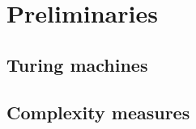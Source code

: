 
\chapter{Preliminaries} \label{chap:preliminaries}

\section{Turing machines}

\section{Complexity measures}

\cleardoublepage